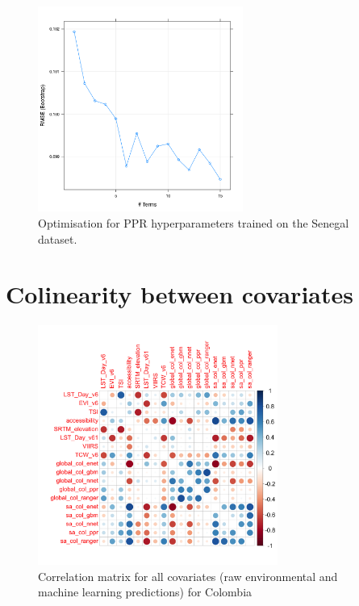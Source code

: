 \documentclass[review]{elsarticle}
\begin{document}
\begin{figure}[h!]
  \centering
  \includegraphics[width=0.6\textwidth]{figs/SI/ppropt_sen.png}
\caption{
  Optimisation for PPR hyperparameters trained on the Senegal dataset.
}

\end{figure}






\clearpage
\section{Colinearity between covariates}


\begin{figure}[h!]
  \centering
  \includegraphics[width=0.7\textwidth]{figs/SI/col_correlation_plot.png}
\caption{
  Correlation matrix for all covariates (raw environmental and machine learning predictions) for Colombia}

\end{figure}
\end{document}
